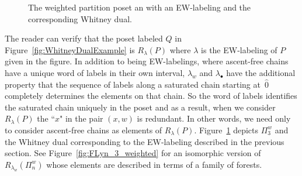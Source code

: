 \documentclass[11pt]{article}
\theoremstyle{definition}
\numberwithin{equation}{section}
\begin{document}
\begin{figure}
{
}
\caption{The weighted partition poset an with an EW-labeling and  the corresponding Whitney dual.}
\label{fig:Pi3wAndWhitneyDual}
\end{figure}
The reader can verify that the poset labeled $Q$ in Figure~\ref{fig:WhitneyDualExample} is $R_\lambda(P)$ where $\lambda$ is the EW-labeling of $P$ given in the figure. In addition to being EW-labelings, where ascent-free chains have a unique word of labels in their own interval, $\lambda_w$ and $\lambda_\bullet$ have the additional property that the sequence of labels along a saturated chain starting at~$\hat{0}$ completely determines the elements on that chain. So the word of labels identifies the saturated chain uniquely in the poset and as a result, when we consider $R_\lambda(P)$ the ``$x$" in the pair $(x,w)$ is redundant. In other words, we need only to consider ascent-free chains as elements of $R_\lambda(P)$.  
Figure~\ref{fig:Pi3wAndWhitneyDual} depicts $\Pi_3^w$ and the Whitney dual corresponding to the EW-labeling described in the previous section. See Figure~\ref{fig:FLyn_3_weighted} for an isomorphic version of $R_{\lambda_w}(\Pi_n^w)$ whose elements are described in terms of a family of forests.
\end{document}

